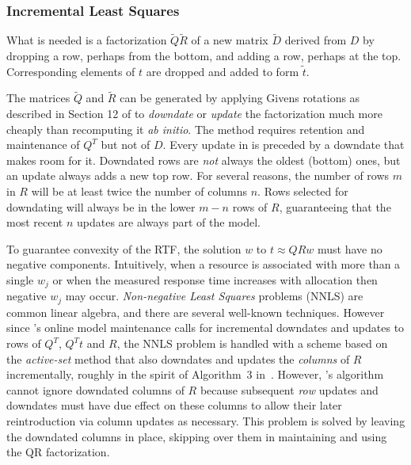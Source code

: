 \subsubsection*{Incremental Least Squares}
What is needed is a factorization $\tilde{Q}\tilde{R}$ of a new matrix $\tilde{D}$
derived from $D$ by dropping a row, perhaps from the bottom,
and adding a row, perhaps at the top.
Corresponding elements of $t$ are dropped and added to form $\tilde{t}$.

The matrices $\tilde{Q}$ and $\tilde{R}$ can be generated by applying Givens rotations
as described in Section 12 of \cite{GoVL} to \emph{downdate} or \emph{update} the factorization
much more cheaply than recomputing it \emph{ab initio}.
The method requires retention and maintenance of $Q^T$ but not of $D$.
Every update in \pacora is preceded by a downdate that makes room for it.
Downdated rows are \emph{not} always the oldest (bottom) ones, but
an update always adds a new top row.
For several reasons, the number of rows $m$ in $R$
will be at least twice the number of columns $n$.
Rows selected for downdating will always be in the lower $m - n$ rows of $R$,
guaranteeing that the most recent $n$ updates are always part of the model.


To guarantee convexity of the RTF, the solution $w$ to $t \approx QRw$ must have no negative components.
Intuitively, when a resource is associated with more than a single $w_j$
or when the measured response time increases with allocation then negative $w_j$ may occur. \emph{Non-negative Least Squares} problems (NNLS) are common linear algebra, and there are several well-known techniques\cite{ChPl}.
However since \pacora's online model maintenance calls for
incremental downdates and updates to rows of $Q^T$, $Q^Tt$ and $R$,
the NNLS problem is handled with a scheme
based on the \emph{active-set} method\cite{LaHa} that
also downdates and updates the \emph{columns} of $R$ incrementally,
roughly in the spirit of Algorithm~3 in~\cite{LuDu}.
However, \pacora's algorithm cannot ignore downdated columns of $R$
because subsequent \emph{row} updates and downdates must have due effect
on these columns to allow their later reintroduction via column updates as necessary.
This problem is solved by leaving the downdated columns in place,
skipping over them in maintaining and using the QR factorization.

